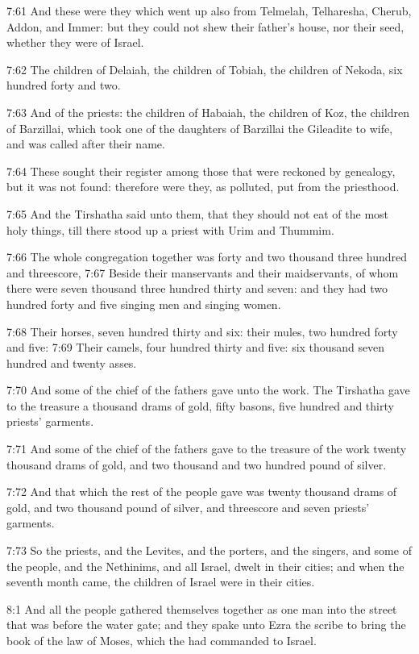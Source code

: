 7:61 And these were they which went up also from Telmelah, Telharesha,
Cherub, Addon, and Immer: but they could not shew their father's
house, nor their seed, whether they were of Israel.

7:62 The children of Delaiah, the children of Tobiah, the children of
Nekoda, six hundred forty and two.

7:63 And of the priests: the children of Habaiah, the children of Koz,
the children of Barzillai, which took one of the daughters of
Barzillai the Gileadite to wife, and was called after their name.

7:64 These sought their register among those that were reckoned by
genealogy, but it was not found: therefore were they, as polluted, put
from the priesthood.

7:65 And the Tirshatha said unto them, that they should not eat of the
most holy things, till there stood up a priest with Urim and Thummim.

7:66 The whole congregation together was forty and two thousand three
hundred and threescore, 7:67 Beside their manservants and their
maidservants, of whom there were seven thousand three hundred thirty
and seven: and they had two hundred forty and five singing men and
singing women.

7:68 Their horses, seven hundred thirty and six: their mules, two
hundred forty and five: 7:69 Their camels, four hundred thirty and
five: six thousand seven hundred and twenty asses.

7:70 And some of the chief of the fathers gave unto the work. The
Tirshatha gave to the treasure a thousand drams of gold, fifty basons,
five hundred and thirty priests' garments.

7:71 And some of the chief of the fathers gave to the treasure of the
work twenty thousand drams of gold, and two thousand and two hundred
pound of silver.

7:72 And that which the rest of the people gave was twenty thousand
drams of gold, and two thousand pound of silver, and threescore and
seven priests' garments.

7:73 So the priests, and the Levites, and the porters, and the
singers, and some of the people, and the Nethinims, and all Israel,
dwelt in their cities; and when the seventh month came, the children
of Israel were in their cities.

8:1 And all the people gathered themselves together as one man into
the street that was before the water gate; and they spake unto Ezra
the scribe to bring the book of the law of Moses, which the \LORD had
commanded to Israel.

